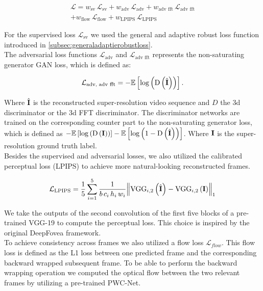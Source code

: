 \documentclass[10pt,twocolumn,letterpaper]{article}
\newcommand{\Tensor}[1]{\boldsymbol{\mathrm{\MakeUppercase{#1}}}}
\newcommand{\Mean}[1]{\mathbb{E}\left[#1\right]}
\begin{document}
	\begin{multline} \label{eq:loss}
	\mathcal{L}=w_{\text{sv}}\,\mathcal{L}_{\text{sv}} + w_{\text{adv}}\,\mathcal{L}_{\text{adv}} + w_{\text{adv fft}}\,\mathcal{L}_{\text{adv fft}}\\
	+ w_{\text{flow}}\,\mathcal{L}_{\text{flow}} + w_{\text{LPIPS}}\,\mathcal{L}_{\text{LPIPS}}    
	\end{multline}
	
	For the supervised loss $\mathcal{L}_{\text{sv}}$ we used the general and adaptive robust loss function introduced in \ref{subsec:generaladaptierobustloss}.\cite{adaptiveroubustloss}\\
	The adversarial loss functions $\mathcal{L}_{\text{adv}}$ and $\mathcal{L}_{\text{adv fft}}$ represents the non-saturating generator GAN loss, which is defined as: \cite{gan}
	
	\begin{equation}
	\mathcal{L}_{\text{adv, adv fft}}=-\Mean{\log \left(\operatorname{D}\left(\hat{\Tensor{I}}\right)\right)}.
	\end{equation}
	
	Where $\hat{\Tensor{I}}$ is the reconstructed super-resolution video sequence and $D$ the 3d discriminator or the 3d FFT discriminator. The discriminator networks are trained on the corresponding counter part to the non-saturating generator loss, which is defined as $-\Mean{\log\left(\operatorname{D}\left(\Tensor{I}\right)\right)}-\Mean{\log\left(1-\operatorname{
			D}\left(\hat{\Tensor{I}}\right)\right)}$. Where $\Tensor{I}$ is the super-resolution ground truth label. \cite{gan}\\
	Besides the supervised and adversarial losses, we also utilized the calibrated perceptual loss (LPIPS) \cite{perceptual} to achieve more natural-looking reconstructed frames.
	
	\begin{equation}
	\mathcal{L}_{\text{LPIPS}} = \frac{1}{5}\sum_{i=1}^{5}\frac{1}{b\,c_{i}\,h_{i}\,w_{i}}\norm{\operatorname{VGG}_{i,2}\left(\hat{\Tensor{I}}\right) - \operatorname{VGG}_{i,2}\left(\Tensor{I}\right)}_{1}
	\end{equation}
	
	We take the outputs of the second convolution of the first five blocks of a pre-trained VGG-19 to compute the perceptual loss. This choice is inspired by the original DeepFovea framework. \cite{vgg, deepfovea}\\
	To achieve consistency across frames we also utilized a flow loss $\mathcal{L}_{flow}$. This flow loss is defined as the L1 loss between one predicted frame and the corresponding backward wrapped subsequent frame. To be able to perform the backward wrapping operation we computed the optical flow between the two relevant frames by utilizing a pre-trained PWC-Net. \cite{deepfovea, pwcnet}
	
\end{document}
